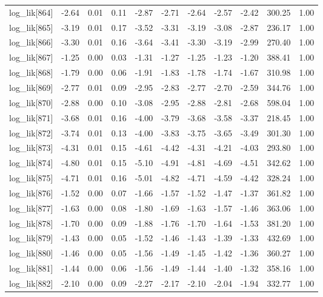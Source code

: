 \begin{table}[ht]
\begin{tabular}{rrrrrrrrrrr}
  log\_lik[864] & -2.64 & 0.01 & 0.11 & -2.87 & -2.71 & -2.64 & -2.57 & -2.42 & 300.25 & 1.00 \\ 
  log\_lik[865] & -3.19 & 0.01 & 0.17 & -3.52 & -3.31 & -3.19 & -3.08 & -2.87 & 236.17 & 1.00 \\ 
  log\_lik[866] & -3.30 & 0.01 & 0.16 & -3.64 & -3.41 & -3.30 & -3.19 & -2.99 & 270.40 & 1.00 \\ 
  log\_lik[867] & -1.25 & 0.00 & 0.03 & -1.31 & -1.27 & -1.25 & -1.23 & -1.20 & 388.41 & 1.00 \\ 
  log\_lik[868] & -1.79 & 0.00 & 0.06 & -1.91 & -1.83 & -1.78 & -1.74 & -1.67 & 310.98 & 1.00 \\ 
  log\_lik[869] & -2.77 & 0.01 & 0.09 & -2.95 & -2.83 & -2.77 & -2.70 & -2.59 & 344.76 & 1.00 \\ 
  log\_lik[870] & -2.88 & 0.00 & 0.10 & -3.08 & -2.95 & -2.88 & -2.81 & -2.68 & 598.04 & 1.00 \\ 
  log\_lik[871] & -3.68 & 0.01 & 0.16 & -4.00 & -3.79 & -3.68 & -3.58 & -3.37 & 218.45 & 1.00 \\ 
  log\_lik[872] & -3.74 & 0.01 & 0.13 & -4.00 & -3.83 & -3.75 & -3.65 & -3.49 & 301.30 & 1.00 \\ 
  log\_lik[873] & -4.31 & 0.01 & 0.15 & -4.61 & -4.42 & -4.31 & -4.21 & -4.03 & 293.80 & 1.00 \\ 
  log\_lik[874] & -4.80 & 0.01 & 0.15 & -5.10 & -4.91 & -4.81 & -4.69 & -4.51 & 342.62 & 1.00 \\ 
  log\_lik[875] & -4.71 & 0.01 & 0.16 & -5.01 & -4.82 & -4.71 & -4.59 & -4.42 & 328.24 & 1.00 \\ 
  log\_lik[876] & -1.52 & 0.00 & 0.07 & -1.66 & -1.57 & -1.52 & -1.47 & -1.37 & 361.82 & 1.00 \\ 
  log\_lik[877] & -1.63 & 0.00 & 0.08 & -1.80 & -1.69 & -1.63 & -1.57 & -1.46 & 363.06 & 1.00 \\ 
  log\_lik[878] & -1.70 & 0.00 & 0.09 & -1.88 & -1.76 & -1.70 & -1.64 & -1.53 & 381.20 & 1.00 \\ 
  log\_lik[879] & -1.43 & 0.00 & 0.05 & -1.52 & -1.46 & -1.43 & -1.39 & -1.33 & 432.69 & 1.00 \\ 
  log\_lik[880] & -1.46 & 0.00 & 0.05 & -1.56 & -1.49 & -1.45 & -1.42 & -1.36 & 360.27 & 1.00 \\ 
  log\_lik[881] & -1.44 & 0.00 & 0.06 & -1.56 & -1.49 & -1.44 & -1.40 & -1.32 & 358.16 & 1.00 \\ 
  log\_lik[882] & -2.10 & 0.00 & 0.09 & -2.27 & -2.17 & -2.10 & -2.04 & -1.94 & 332.77 & 1.00 \\ 

\end{tabular}
\end{table}

